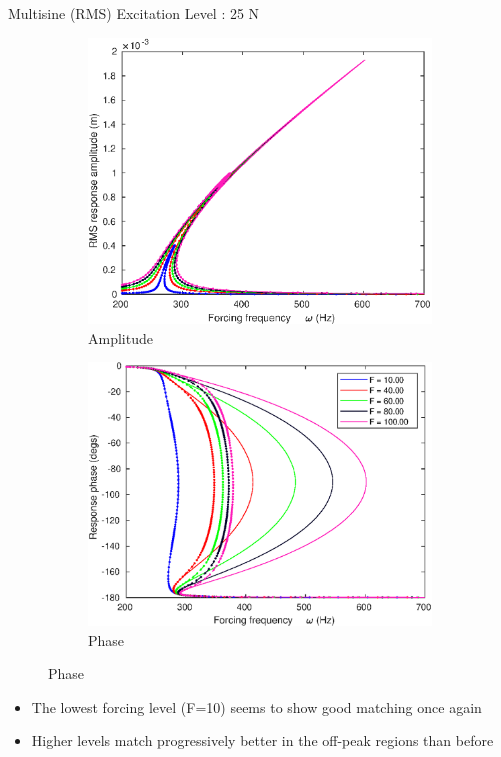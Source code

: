 \documentclass[aspectratio=169]{beamer}
\begin{document}
\begin{frame}[allowframebreaks]
  \begin{block}{Multisine (RMS) Excitation Level : 25 N}
    \begin{figure}
      \centering
      \begin{subfigure}{0.5\linewidth}
        \centering
        \includegraphics[width=0.8\linewidth]{../../../benchmark1/fig/pnlssfrf_A25_Amp}
        \caption{Amplitude}
      \end{subfigure}%
      \begin{subfigure}{0.5\linewidth}
        \centering
        \includegraphics[width=0.8\linewidth]{../../../benchmark1/fig/pnlssfrf_A25_Phase}
        \caption{Phase}
      \end{subfigure}
    \end{figure}
  \end{block}
  \vspace{-0.75cm}  
  \begin{itemize}
  \item The lowest forcing level (F=10) seems to show good matching
    once again
  \item Higher levels match progressively better in the off-peak
    regions than before
  \end{itemize}


\end{frame}
\end{document}
